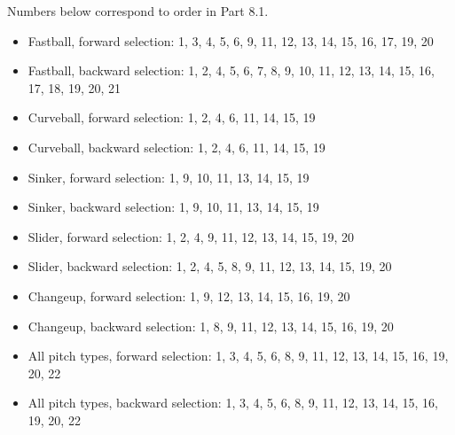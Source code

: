 \documentclass{article}
\begin{document}
Numbers below correspond to order in Part 8.1.

\begin{itemize}
\item Fastball, forward selection: 1, 3, 4, 5, 6, 9, 11, 12, 13, 14, 15, 16, 17, 19, 20
\item Fastball, backward selection: 1, 2, 4, 5, 6, 7, 8, 9, 10, 11, 12, 13, 14, 15, 16, 17, 18, 19, 20, 21
\item Curveball, forward selection: 1, 2, 4, 6, 11, 14, 15, 19
\item Curveball, backward selection: 1, 2, 4, 6, 11, 14, 15, 19
\item Sinker, forward selection: 1, 9, 10, 11, 13, 14, 15, 19
\item Sinker, backward selection: 1, 9, 10, 11, 13, 14, 15, 19
\item Slider, forward selection: 1, 2, 4, 9, 11, 12, 13, 14, 15, 19, 20
\item Slider, backward selection: 1, 2, 4, 5, 8, 9, 11, 12, 13, 14, 15, 19, 20
\item Changeup, forward selection: 1, 9, 12, 13, 14, 15, 16, 19, 20
\item Changeup, backward selection: 1, 8, 9, 11, 12, 13, 14, 15, 16, 19, 20
\item All pitch types, forward selection: 1, 3, 4, 5, 6, 8, 9, 11, 12, 13, 14, 15, 16, 19, 20, 22
\item All pitch types, backward selection: 1, 3, 4, 5, 6, 8, 9, 11, 12, 13, 14, 15, 16, 19, 20, 22
\end{itemize}
\end{document}
